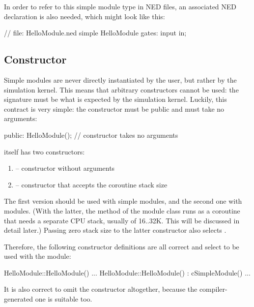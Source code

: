 In order to refer to this simple module type in NED files,
an associated NED declaration is also needed, which might look like this:

\begin{ned}
// file: HelloModule.ned
simple HelloModule
{
    gates:
        input in;
}
\end{ned}


\subsection{Constructor}
\label{sec:simple-modules:module-ctor}

Simple modules are never directly instantiated by the user, but rather by
the simulation kernel. This means that arbitrary constructors cannot be used:
the signature must be what is expected by the simulation kernel.
Luckily, this contract is very simple: the constructor must be public and must take
no arguments:

\begin{cpp}
  public:
    HelloModule();  // constructor takes no arguments
\end{cpp}

 itself has two constructors:
\begin{enumerate}
  \item {} -- constructor without arguments
  \item {} -- constructor that accepts the coroutine
        stack size
\end{enumerate}

The first version should be used with  simple modules,
and the second one with  modules.
(With the latter, the  method of the module class
runs as a coroutine that needs a separate CPU stack,
usually of 16..32K. This will be discussed in detail later.)
Passing zero stack size to the latter constructor also selects .

Therefore, the following constructor definitions are all correct and select
 to be used with the module:

\begin{cpp}
HelloModule::HelloModule() {...}
HelloModule::HelloModule() : cSimpleModule() {...}
\end{cpp}

It is also correct to omit the constructor altogether, because the
compiler-generated one is suitable too.

